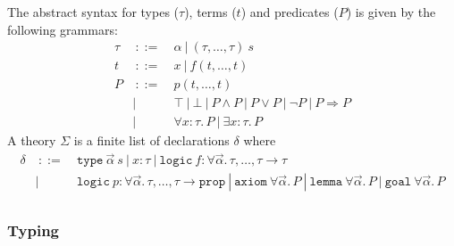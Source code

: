 \documentclass[a4paper,12pt]{report}
\begin{document}
The abstract syntax for types ($\tau$), terms ($t$) and predicates
($P$) is given by the following grammars:
\begin{displaymath}
  \begin{array}{rrl}
    \tau & ~::=~ & \alpha ~|~ (\tau,\dots,\tau)~s \\
    t & ~::=~ & x ~|~ f(t,\dots,t) \\
    P & ~::=~ & p(t,\dots,t) \\ 
      &    |~~ & \top ~|~ \bot ~|~ P \land P ~|~ P \lor P
                 ~|~ \lnot P ~|~ P\Rightarrow P \\
      &    |~~ & \forall x:\tau.\,P ~|~ \exists x:\tau.\,P
  \end{array}
\end{displaymath}
A theory $\Sigma$ is a finite list of declarations $\delta$ where
\begin{displaymath}
  \begin{array}{rrl}
  \delta & ~::=~ & 
      \texttt{type}~\vec{\alpha}~s ~|~ x:\tau ~|~
      \mathtt{logic}~f:\forall\vec{\alpha}.\,\tau,\dots,\tau\rightarrow\tau \\
         &    |~~ &   
      \mathtt{logic}~p:\forall\vec{\alpha}.\,\tau,\dots,\tau\rightarrow\mathtt{prop} ~|~ 
      \texttt{axiom}~\forall\vec{\alpha}.\,P ~|~
      \texttt{lemma}~\forall\vec{\alpha}.\,P ~|~
      \texttt{goal}~\forall\vec{\alpha}.\,P \\
  \end{array} 
\end{displaymath}

\subsubsection{Typing}

\newcommand{\Subst}[2]{\ensuremath{\mathsf{Subst}(#1,#2)}}
\end{document}
